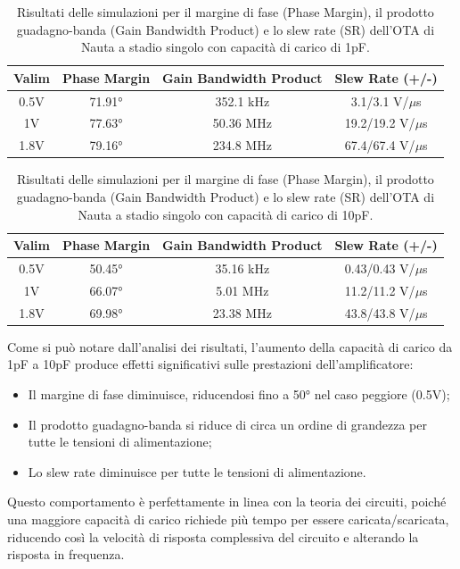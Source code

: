\begin{table}[H]
    \centering
    \caption{Risultati delle simulazioni per il margine di fase (Phase Margin), il prodotto guadagno-banda (Gain Bandwidth Product) e lo slew rate (SR) dell'OTA di Nauta a stadio singolo con capacità di carico di 1pF.}
    \begin{tabular}{|c|c|c|c|}
        \hline
        \textbf{Valim} & \textbf{Phase Margin} & \textbf{Gain Bandwidth Product} & \textbf{Slew Rate (+/-)} \\ \hline
        0.5V & 71.91° & 352.1 kHz & 3.1/3.1 V/$\mu$s \\ \hline
        1V & 77.63° & 50.36 MHz & 19.2/19.2 V/$\mu$s \\ \hline
        1.8V & 79.16° & 234.8 MHz & 67.4/67.4 V/$\mu$s \\ \hline
    \end{tabular}
    \label{tab:results_nauta_single_stage_1pF}
\end{table}

\begin{table}[H]
    \centering
    \caption{Risultati delle simulazioni per il margine di fase (Phase Margin), il prodotto guadagno-banda (Gain Bandwidth Product) e lo slew rate (SR) dell'OTA di Nauta a stadio singolo con capacità di carico di 10pF.}
    \begin{tabular}{|c|c|c|c|}
        \hline
        \textbf{Valim} & \textbf{Phase Margin} & \textbf{Gain Bandwidth Product} & \textbf{Slew Rate (+/-)} \\ \hline
        0.5V & 50.45° & 35.16 kHz & 0.43/0.43 V/$\mu$s \\ \hline
        1V & 66.07° & 5.01 MHz & 11.2/11.2 V/$\mu$s \\ \hline
        1.8V & 69.98° & 23.38 MHz & 43.8/43.8 V/$\mu$s \\ \hline
    \end{tabular}

    \label{tab:results_nauta_single_stage_10pF}
\end{table}

Come si può notare dall'analisi dei risultati, l'aumento della capacità di carico da 1pF a 10pF produce effetti significativi sulle prestazioni dell'amplificatore:
\begin{itemize}
    \item Il margine di fase diminuisce, riducendosi fino a 50° nel caso peggiore (0.5V);
    \item Il prodotto guadagno-banda si riduce di circa un ordine di grandezza per tutte le tensioni di alimentazione;
    \item Lo slew rate diminuisce per tutte le tensioni di alimentazione.
\end{itemize}
Questo comportamento è perfettamente in linea con la teoria dei circuiti, poiché una maggiore capacità di carico richiede più tempo per essere caricata/scaricata, riducendo così la velocità di risposta complessiva del circuito e alterando la risposta in frequenza.

